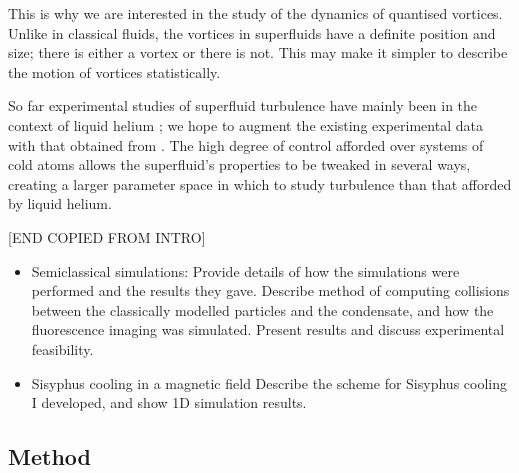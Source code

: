 This is why we are interested in the study of the dynamics of quantised vortices. Unlike in classical fluids, the vortices in superfluids have a definite position and size; there is either a vortex or there is not. This may make it simpler to describe the motion of vortices statistically.

So far experimental studies of superfluid turbulence have mainly been in the context of liquid helium \cite{leggett_superfluidity_1999}; we hope to augment the existing experimental data with that obtained from \bec. The high degree of control afforded over systems of cold atoms allows the superfluid's properties to be tweaked in several ways, creating a larger parameter space in which to study turbulence than that afforded by liquid helium.


[END COPIED FROM INTRO]


\begin{itemize}
\item Semiclassical simulations:
Provide details of how the simulations were performed and the results they gave. Describe method of computing collisions between the classically modelled particles and the condensate, and how the fluorescence imaging was simulated. Present results and discuss experimental feasibility.

\item{Sisyphus cooling in a magnetic field}
Describe the scheme for Sisyphus cooling I developed, and show 1D simulation results.

\end{itemize}


\subsection{Method}

